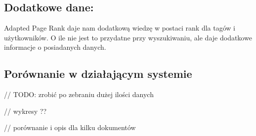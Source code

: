 \subsection*{Dodatkowe dane:}
Adapted Page Rank daje nam dodatkową wiedzę w postaci rank dla tagów i użytkowników. O ile nie jest to przydatne przy wyszukiwaniu, ale daje dodatkowe informacje o posiadanych danych.



\subsection{Porównanie w działającym systemie}
// TODO: zrobić po zebraniu dużej ilości danych

// wykresy ??

// porównanie i opis dla kilku dokumentów


















